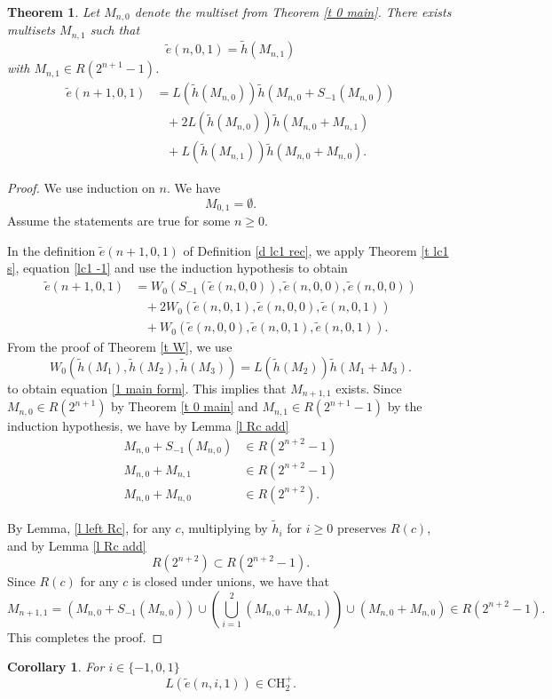 \documentclass[11pt, oneside]{article}   	%
\newtheorem{theorem}{Theorem}
\newtheorem{corollary}{Corollary}
\newcommand{\ti}{\tilde{h}}
\newcommand{\te}{\tilde{e}}
\begin{document}
\begin{theorem} \label{t 1 main}
Let $M_{n,0}$ denote the multiset from Theorem \ref{t 0 main}. 
There exists multisets $M_{n,1}$ such that 
\[
\te(n,0,1) = \ti(M_{n,1})
\]
with $M_{n,1} \in R(2^{n+1}-1)$.
\begin{align}
\te(n+1,0,1) &= L(\ti(M_{n,0})) \ti(M_{n,0}+ S_{-1}(M_{n,0})) \nonumber  \\ 
&\,\,\,\,\,+ 2L(\ti(M_{n,0})) \ti(M_{n,0}+ M_{n,1})\nonumber \\ 
&\,\,\,\,\,+L(\ti(M_{n,1})) \ti(M_{n,0}+ M_{n,0}) \label{1 main form}.
\end{align}

\end{theorem} 
\begin{proof}
We use induction on $n$. We have 
\[
M_{0,1} = \emptyset.
\]
Assume the statements are true for some $n \geq 0$. 

In the definition $\te(n+1,0,1)$ of Definition \ref{d lc1 rec}, we apply Theorem \ref{t lc1 s}, equation \eqref{lc1 -1} and use the induction hypothesis to obtain 
 \begin{align*}
 \te(n+1,0,1) &= W_0(S_{-1}(\te(n,0,0)), \te(n,0,0), \te(n,0,0))\\
  &\,\,\,\,\,+ 2W_0(\te(n,0,1),\te(n,0,0),\te(n,0,1))\\ 
  &\,\,\,\,\,+W_0(\te(n,0,0), \te(n,0,1), \te(n,0,1)).
 \end{align*}
  From the proof of Theorem \ref{t W}, we use
 \[
 W_0(\ti(M_1), \ti(M_2), \ti(M_3)) = L(\ti(M_2))\ti(M_1+M_3).
 \]
 to obtain equation \eqref{1 main form}. 
 This implies that $M_{n+1,1}$ exists. Since $M_{n,0} \in R(2^{n+1})$ by Theorem \ref{t 0 main} and $M_{n,1} \in R(2^{n+1}-1)$ by the induction hypothesis, we have by Lemma \ref{l Rc add} 
 \begin{align*}
 M_{n,0}+ S_{-1}(M_{n,0}) &\in R(2^{n+2}-1)\\ 
 M_{n,0}+ M_{n,1} &\in R(2^{n+2}-1) \\ 
 M_{n,0}+ M_{n,0}  &\in R(2^{n+2}). 
 \end{align*}

By Lemma, \ref{l left Rc}, for any $c$, multiplying by $\ti_i$ for $i \geq 0$ preserves $R(c)$, and by Lemma \ref{l Rc add} 
\[
R(2^{n+2}) \subset R(2^{n+2}-1).
\]
Since $R(c)$ for any $c$ is closed under unions, we have that \[
M_{n+1,1}  = ( M_{n,0}+ S_{-1}(M_{n,0})) \cup (\bigcup_{i=1}^2 ( M_{n,0}+ M_{n,1}))\cup ( M_{n,0}+ M_{n,0}) \in R(2^{n+2}-1).
\] This completes the proof. 
\end{proof}
\begin{corollary} 

For $i \in \{ -1,0,1\}$
\[
L(\te(n,i,1)) \in \mathrm{CH}_2^+.
\]
\end{corollary} 
\end{document}
